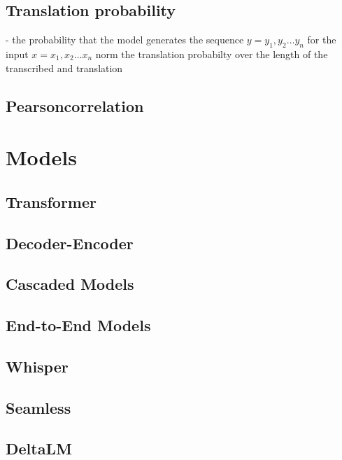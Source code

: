 \subsection{Translation probability}
- the probability that the model generates the sequence $y = y_1, y_2 \dots y_n$ for the input $x=x_1, x_2 \dots x_n$
norm the translation probabilty over the length of the transcribed and translation 
\subsection{Pearsoncorrelation}

\section{Models}
\subsection{Transformer}
\subsection{Decoder-Encoder}
\subsection{ Cascaded Models}
\subsection{End-to-End Models}
\subsection{Whisper}
\subsection{Seamless}

\subsection{DeltaLM}

